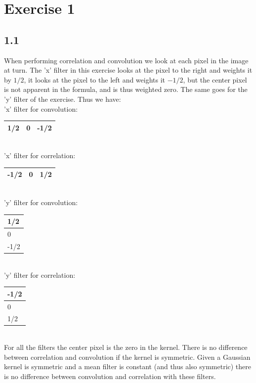 \section{Exercise 1}
\subsection*{1.1}
When performing correlation and convolution we look at each pixel in the image at turn. The 'x' filter in this exercise looks at the pixel to the right and weights it by $1/2$, it looks at the pixel to the left and weights it $-1/2$, but the center pixel is not apparent in the formula, and is thus weighted zero. The same goes for the 'y' filter of the exercise. Thus we have:\\ 
'x' filter for convolution:	\begin{tabular}{|l|l|l|}
	\hline
	1/2 & 0 & -1/2 \\ \hline
\end{tabular}\\
'x' filter for correlation: \begin{tabular}{|l|l|l|}
	\hline
	-1/2 & 0 & 1/2 \\ \hline
\end{tabular}\\
'y' filter for convolution: \begin{tabular}{|l|}
		\hline
		1/2  \\ \hline
		0    \\ \hline
		-1/2 \\ \hline
	\end{tabular}\\
'y' filter for correlation: \begin{tabular}{|l|}
	\hline
	-1/2  \\ \hline
	0    \\ \hline
	1/2 \\ \hline
\end{tabular}\\
For all the filters the center pixel is the zero in the kernel. There is no difference between correlation and convolution if the kernel is symmetric. Given a Gaussian kernel is symmetric and a mean filter is constant (and thus also symmetric) there is no difference between convolution and correlation with these filters.

